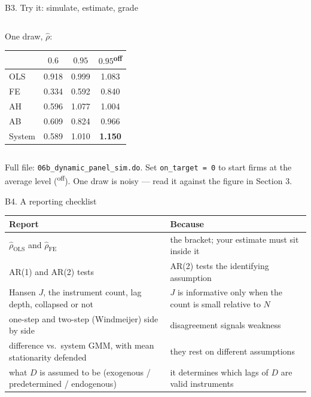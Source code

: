 \documentclass[
  11pt,
  ignorenonframetext,
  aspectratio=169,
]{beamer}
\begin{document}
\begin{frame}[fragile]{B3. Try it: simulate, estimate, grade}
\begin{columns}[T]
\begin{column}{0.32\linewidth}
\vspace{0.3em}
\begin{center}\scriptsize
One draw, $\hat\rho$:\\[0.3em]
\begin{tabular}{lccc}
\toprule
 & $0.6$ & $0.95$ & $0.95$\textsuperscript{off} \\
\midrule
OLS    & 0.918 & 0.999 & 1.083 \\
FE     & 0.334  & 0.592  & 0.840  \\
AH     & 0.596  & 1.077  & 1.004  \\
AB     & 0.609  & 0.824  & 0.966  \\
System & 0.589 & 1.010 & \textbf{1.150} \\
\bottomrule
\end{tabular}
\end{center}
\end{column}
\end{columns}

\footnotesize

Full file: \texttt{06b\_dynamic\_panel\_sim.do}. Set
\texttt{on\_target\ =\ 0} to start firms at the average level
(\textsuperscript{off}). One draw is noisy --- read it against the
figure in Section 3. \normalsize
\end{frame}

\begin{frame}{B4. A reporting checklist}
\protect{}\label{b4.-a-reporting-checklist}
\begin{center}\small
\begin{tabular}{R{5.2cm}R{7.4cm}}
\toprule
Report & Because \\
\midrule
$\hat\rho_{\text{OLS}}$ and $\hat\rho_{\text{FE}}$ & the bracket; your estimate must sit inside it \\
AR(1) and AR(2) tests & AR(2) tests the identifying assumption \\
Hansen $J$, the instrument count, lag depth, collapsed or not & $J$ is informative only when the count is small relative to $N$ \\
one-step and two-step (Windmeijer) side by side & disagreement signals weakness \\
difference vs.\ system GMM, with mean stationarity defended & they rest on different assumptions \\
what $D$ is assumed to be (exogenous / predetermined / endogenous) & it determines which lags of $D$ are valid instruments \\
\bottomrule
\end{tabular}
\end{center}
\end{frame}
\end{document}

